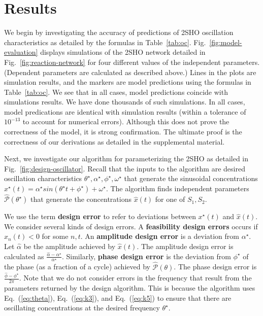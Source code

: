 \documentclass{bmcart}
\newcommand{\eqn}[1]{Eq.~(\ref{#1})}
\newcommand{\fig}[1]{Fig.~\ref{#1}}
\newcommand{\tab}[1]{Table~\ref{#1}}
\begin{document}
\section*{Results}\label{sec:results}
We begin by investigating the accuracy of predictions of 2SHO oscillation characteristics as detailed
by the formulas in \tab{tab:oc}.
\fig{fig:model-evaluation}
displays simulations of the 2SHO network detailed in
\fig{fig:reaction-network} for four different values of the independent parameters. (Dependent parameters are calculated as described above.)
Lines in the plots
are simulation results, and the markers are model predictions using the formulas in \tab{tab:oc}.
We see that in all cases, model predictions coincide with simulations results.
We have done thousands of such simulations.
In all cases,
model predications are identical with simulation results (within a tolerance
of $10^{-13}$ to account for numerical errors).
Although this does not prove the correctness of the model, it is
strong confirmation. The ultimate proof is the correctness of our derivations
as detailed in the supplemental material.

Next, we investigate our algorithm for parameterizing the 2SHO as detailed in
\fig{fig:design-oscillator}. Recall that the inputs to the algorithm are desired oscillation characteristics
$\theta^{\star}, \alpha^{\star}, \phi^{\star}, \omega^{\star}$ that generate the sinusoidal concentrations $x^{\star}(t) = \alpha^{\star} sin(\theta^{\star} t + \phi^{\star}) + \omega^{\star}$.
The algorithm finds independent parameters $\hat{\mathcal{P}} (\theta^{\star})$ that generate the concentrations $\hat{x} (t)$ for one of $S_1, S_2$.

We use the term {\bf design error} to refer to deviations between $x^{\star}(t)$ and $\hat{x}(t)$. We consider several kinds of design errors. A {\bf feasibility design errors} occurs
        if $\hat{x}_n (t) < 0$ for some $n, t$. An {\bf amplitude design error} is a deviation from $\alpha^{\star}$. Let $\hat{\alpha}$ be the amplitude achieved by $\hat{x}(t).$ The amplitude design error is calculated as $\frac{\hat{\alpha} - \alpha^{\star}}{\alpha^{\star}}$. Similarly, {\bf phase design error} is the deviation from $\phi^{\star}$ of the phase (as a fraction of a cycle) achieved by $\hat{\mathcal{P}}(\theta)$. The phase design error is $\frac{\hat{\phi} - \phi^{\star}}{2\pi}$.
Note that we do not consider errors in the frequency that result from the parameters returned by the design algorithm. This is because the algorithm uses \eqn{eq:theta}, \eqn{eq:k3}, and \eqn{eq:k5} to ensure that there are oscillating concentrations at the desired frequency $\theta^{\star}$.
\end{document}
